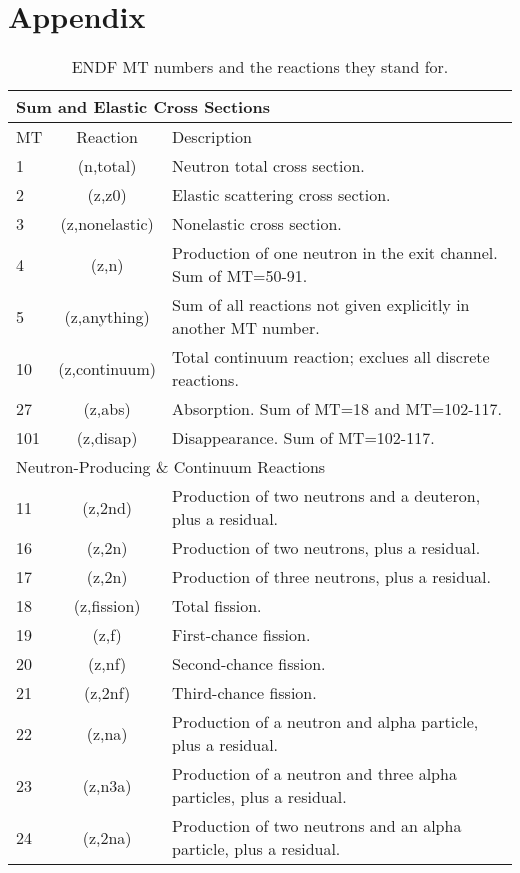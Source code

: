 \chapter{Appendix}


\begin{table}[h]
\centering
\caption{ENDF MT numbers and the reactions they stand for.}
\label{MT_numbers}\scriptsize
\begin{tabular}{| l | c | l |}
\multicolumn{3}{l}{Sum and Elastic Cross Sections}\\
\hline
MT & Reaction & Description \\
\hline
1	  & (n,total)	    &  Neutron total cross section. \\
2	  & (z,z0)	      & Elastic scattering cross section.\\
3	  & (z,nonelastic)&	Nonelastic cross section. \\
4	  & (z,n)	        &  Production of one neutron in the exit channel. Sum of MT=50-91.	\\
5	  & (z,anything)	& Sum of all reactions not given explicitly in another MT number. \\
10	& (z,continuum)	& Total continuum reaction; exclues all discrete reactions.	\\
27	& (z,abs)	    &    Absorption. Sum of MT=18 and MT=102-117.	\\
101	& (z,disap)	  &   Disappearance. Sum of MT=102-117.	\\
\hline
\multicolumn{3}{l}{Neutron-Producing \& Continuum Reactions}\\
\hline
11	& (z,2nd)	    &  Production of two neutrons and a deuteron, plus a residual.	\\
16	& (z,2n)	    &   Production of two neutrons, plus a residual.	\\
17	& (z,2n)	    &   Production of three neutrons, plus a residual.	\\
18	& (z,fission)  &	   Total fission.\\
19	& (z,f)	   &      First-chance fission.	\\
20	& (z,nf)	 &       Second-chance fission.	\\
21	& (z,2nf)	 &    Third-chance fission.	\\
22	& (z,na)	 &    Production of a neutron and alpha particle, plus a residual.	\\
23	& (z,n3a)	 &    Production of a neutron and three alpha particles, plus a residual.	\\
24	& (z,2na)	 &    Production of two neutrons and an alpha particle, plus a residual.	\\

\end{tabular}
\end{table}
